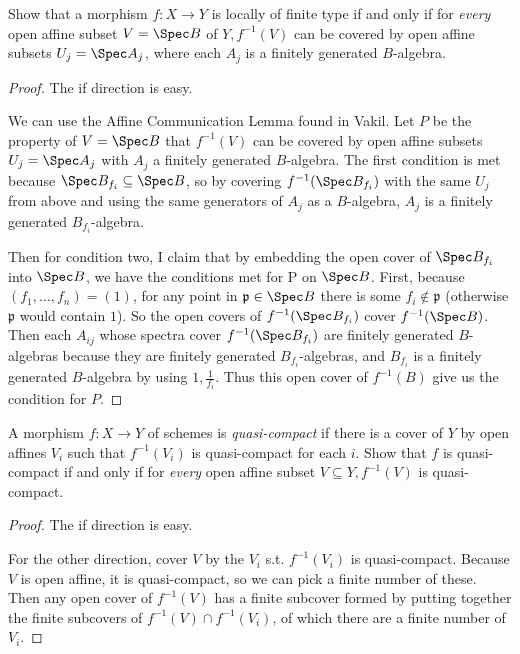 \begin{exercise}%
	Show that a morphism $f: X\to Y $ is locally of finite type if and only if for \textit{every} open affine subset $V = \Spec B $ of $Y, f^{-1}(V) $ can be covered by open affine subsets $U_j = \Spec A_j $, where each $A_j $ is a finitely generated $B $-algebra.
\end{exercise}
\begin{proof}
	The if direction is easy.

	We can use the Affine Communication Lemma found in Vakil.
	Let $P $ be the property of $V = \Spec B $ that $f^{-1}(V) $ can be covered by open affine subsets $U_j = \Spec A_j $ with $A_j $ a finitely generated $B $-algebra.
	The first condition is met because $\Spec B_{f_i} \subseteq \Spec B $, so by covering $f^{-1}(\Spec B_{f_i}) $ with the same $U_j $ from above and using the same generators of $A_j $ as a $B $-algebra, $A_j $ is a finitely generated $B_{f_i}$-algebra.

	Then for condition two, I claim that by embedding the open cover of $\Spec B_{f_i} $ into $\Spec B $, we have the conditions met for P on $\Spec B $.
	First, because $(f_1, \ldots , f_n) = (1) $, for any point in $\mathfrak{p} \in \Spec B $ there is some $f_i \notin \mathfrak{p}$ (otherwise $\mathfrak{p} $ would contain $1 $).
	So the open covers of $f^{-1}(\Spec B_{f_i})$ cover $f^{-1}(\Spec B) $.
	Then each $A_{ij} $ whose spectra cover $f^{-1}(\Spec B_{f_{i}}) $ are finitely generated $B $-algebras because they are finitely generated $B_{f_{i}} $-algebras, and $B_{f_{i}} $ is a finitely generated $B $-algebra by using $1, \frac{1}{f_{i}} $.
	Thus this open cover of $f^{-1}(B) $ give us the condition for $P $.
\end{proof}

\begin{exercise}%
	A morphism $f: X\to Y $ of schemes is \textit{quasi-compact} if there is a cover of $Y $ by open affines $V_i$ such that $f^{-1}(V_i) $ is quasi-compact for each $i $. Show that $f $ is quasi-compact if and only if for \textit{every} open affine subset $V\subseteq Y, f^{-1}(V) $ is quasi-compact.
\end{exercise}
\begin{proof}
	The if direction is easy.

	For the other direction, cover $V $ by the $V_i $ s.t. $f^{-1}(V_i) $ is quasi-compact.
	Because $V $ is open affine, it is quasi-compact, so we can pick a finite number of these.
	Then any open cover of $f^{-1}(V) $ has a finite subcover formed by putting together the finite subcovers of $f^{-1}(V) \cap f^{-1}(V_i) $, of which there are a finite number of $V_i $.
\end{proof}

